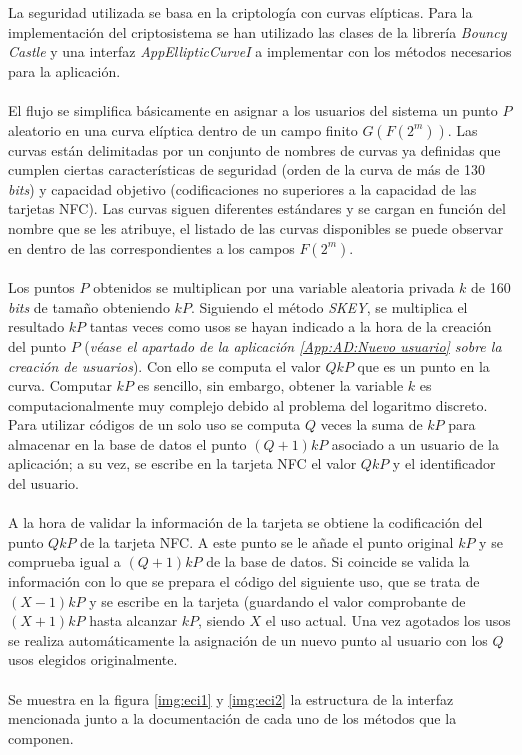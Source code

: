 \documentclass[../PFC.tex]{subfiles}
\begin{document}
La seguridad utilizada se basa en la criptología con curvas elípticas. Para la implementación del criptosistema se han utilizado las clases de la librería \textit{Bouncy Castle} y una interfaz \textit{AppEllipticCurveI} a implementar con los métodos necesarios para la aplicación.
\\\\
El flujo se simplifica básicamente en asignar a los usuarios del sistema un punto $P$ aleatorio en una curva elíptica dentro de un campo finito $G(F(2^m))$. Las curvas están delimitadas por un conjunto de nombres de curvas ya definidas que cumplen ciertas características de seguridad (orden de la curva de más de 130 \textit{bits}) y capacidad objetivo (codificaciones no superiores a la capacidad de las tarjetas NFC). Las curvas siguen diferentes estándares y se cargan en función del nombre que se les atribuye, el listado de las curvas disponibles se puede observar en \cite{bouncyCastleCurves} dentro de las correspondientes a los campos $F(2^m)$.
\\\\
Los puntos $P$ obtenidos se multiplican por una variable aleatoria privada $k$ de 160 \textit{bits} de tamaño obteniendo $kP$. Siguiendo el método \textit{SKEY}, se multiplica el resultado $kP$ tantas veces como usos se hayan indicado a la hora de la creación del punto $P$ (\textit{véase el apartado de la aplicación \ref{App:AD:Nuevo usuario} sobre la creación de usuarios}). Con ello se computa el valor $QkP$ que es un punto en la curva. Computar $kP$ es sencillo, sin embargo, obtener la variable $k$ es computacionalmente muy complejo debido al problema del logaritmo discreto. Para utilizar códigos de un solo uso se computa $Q$ veces la suma de $kP$ para almacenar en la base de datos el punto $(Q+1)kP$ asociado a un usuario de la aplicación; a su vez, se escribe en la tarjeta NFC el valor $QkP$ y el identificador del usuario.
\\\\
A la hora de validar la información de la tarjeta se obtiene la codificación del punto $QkP$ de la tarjeta NFC. A este punto se le añade el punto original $kP$ y se comprueba igual a $(Q+1)kP$ de la base de datos. Si coincide se valida la información con lo que se prepara el código del siguiente uso, que se trata de $(X-1)kP$ y se escribe en la tarjeta (guardando el valor comprobante de $(X+1)kP$ hasta alcanzar $kP$, siendo $X$ el uso actual. Una vez agotados los usos se realiza automáticamente la asignación de un nuevo punto al usuario con los $Q$ usos elegidos originalmente.
\\\\
Se muestra en la figura \ref{img:eci1} y \ref{img:eci2} la estructura de la interfaz mencionada junto a la documentación de cada uno de los métodos que la componen.
 
\end{document}
